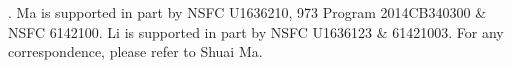 .
Ma is supported in part by NSFC U1636210, 973 Program 2014CB340300 \& NSFC 6142100.
Li is supported in part by NSFC U1636123 \& 61421003.
 For any correspondence, please refer to Shuai Ma.
